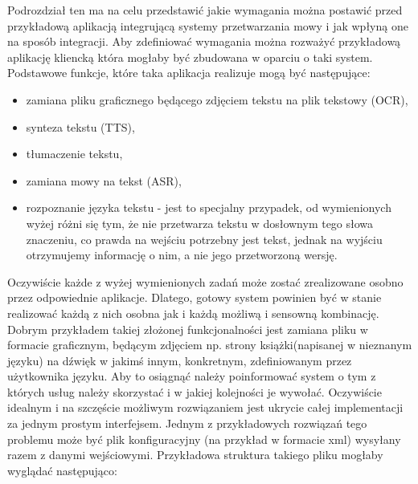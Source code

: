 Podrozdział ten ma na celu przedstawić  jakie wymagania można postawić przed przykładową aplikacją integrującą systemy przetwarzania mowy i jak wpłyną one na sposób integracji. Aby zdefiniować wymagania można rozważyć przykładową aplikację kliencką która mogłaby być zbudowana w oparciu o taki system. Podstawowe funkcje, które taka aplikacja realizuje mogą być następujące:
\begin{itemize}
	\item zamiana pliku graficznego będącego zdjęciem tekstu na plik tekstowy (OCR),
	\item synteza tekstu (TTS),
	\item tłumaczenie tekstu,
	\item zamiana mowy na tekst (ASR),
	\item rozpoznanie języka tekstu - jest to specjalny przypadek, od wymienionych wyżej różni się tym, że nie przetwarza tekstu w dosłownym tego słowa znaczeniu, co prawda na wejściu potrzebny jest tekst, jednak na wyjściu otrzymujemy informację o nim, a nie jego przetworzoną wersję.
\end{itemize}
Oczywiście każde z wyżej wymienionych zadań może zostać zrealizowane osobno przez odpowiednie aplikacje. Dlatego, gotowy system powinien być w stanie realizować każdą z nich osobna jak i każdą możliwą i sensowną kombinację. Dobrym przykładem takiej złożonej funkcjonalności jest zamiana pliku w formacie graficznym, będącym zdjęciem np. strony książki(napisanej w nieznanym języku) na dźwięk w jakimś innym, konkretnym, zdefiniowanym przez użytkownika języku. Aby to osiągnąć należy poinformować system o tym z których usług należy skorzystać i w jakiej kolejności je wywołać. Oczywiście idealnym i na szczęście możliwym rozwiązaniem jest ukrycie całej implementacji za jednym prostym interfejsem. Jednym z przykładowych rozwiązań tego problemu może być plik konfiguracyjny (na przykład w formacie xml) wysyłany razem z danymi wejściowymi. Przykładowa struktura takiego pliku mogłaby wyglądać następująco:
